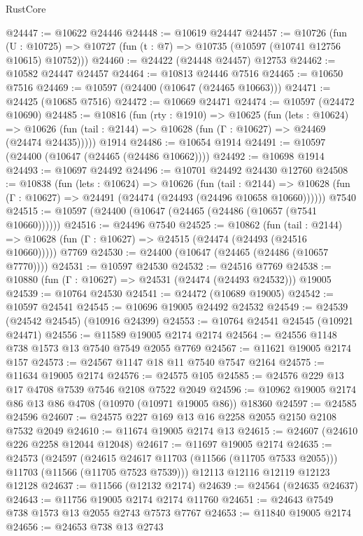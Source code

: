 \begin{lexlean}{RustCore}
\begin{coremodule}
@24447 := @10622 @24446
@24448 := @10619 @24447
@24457 := @10726
    (fun (U : @10725) => @10727 (fun (t : @7) => @10735 (@10597 (@10741 @12756 @10615) @10752)))
@24460 := @24422 (@24448 @24457) @12753
@24462 := @10582 @24447 @24457
@24464 := @10813 @24446 @7516
@24465 := @10650 @7516
@24469 := @10597 (@24400 (@10647 (@24465 @10663)))
@24471 := @24425 (@10685 @7516)
@24472 := @10669 @24471
@24474 := @10597 (@24472 @10690)
@24485 := @10816
    (fun (rty : @1910) =>
    @10625
      (fun (lets : @10624) =>
      @10626 (fun (tail : @2144) => @10628 (fun (Γ : @10627) => @24469 (@24474 @24435)))))
    @1914
@24486 := @10654 @1914
@24491 := @10597 (@24400 (@10647 (@24465 (@24486 @10662))))
@24492 := @10698 @1914
@24493 := @10697 @24492
@24496 := @10701 @24492 @24430 @12760
@24508 := @10838
    (fun (lets : @10624) =>
    @10626
      (fun (tail : @2144) =>
      @10628 (fun (Γ : @10627) => @24491 (@24474 (@24493 (@24496 @10658 @10660))))))
    @7540
@24515 := @10597 (@24400 (@10647 (@24465 (@24486 (@10657 (@7541 @10660))))))
@24516 := @24496 @7540
@24525 := @10862
    (fun (tail : @2144) => @10628 (fun (Γ : @10627) => @24515 (@24474 (@24493 (@24516 @10660)))))
    @7769
@24530 := @24400 (@10647 (@24465 (@24486 (@10657 @7770))))
@24531 := @10597 @24530
@24532 := @24516 @7769
@24538 := @10880 (fun (Γ : @10627) => @24531 (@24474 (@24493 @24532))) @19005
@24539 := @10764 @24530
@24541 := @24472 (@10689 @19005)
@24542 := @10597 @24541
@24545 := @10696 @19005 @24492 @24532
@24549 := @24539 (@24542 @24545) (@10916 @24399)
@24553 := @10764 @24541 @24545 (@10921 @24471)
@24556 := @11589 @19005 @2174 @2174
@24564 := @24556 @1148 @738 @1573 @13 @7540 @7549 @2055 @7769
@24567 := @11621 @19005 @2174 @157
@24573 := @24567 @1147 @18 @11 @7540 @7547 @2164
@24575 := @11634 @19005 @2174
@24576 := @24575 @105
@24585 := @24576 @229 @13 @17 @4708 @7539 @7546 @2108 @7522 @2049
@24596 := @10962 @19005 @2174 @86 @13 @86 @4708 (@10970 (@10971 @19005 @86)) @18360
@24597 := @24585 @24596
@24607 := @24575 @227 @169 @13 @16 @2258 @2055 @2150 @2108 @7532 @2049
@24610 := @11674 @19005 @2174 @13
@24615 := @24607 (@24610 @226 @2258 @12044 @12048)
@24617 := @11697 @19005 @2174
@24635 := @24573
    (@24597
      (@24615 @24617 @11703 (@11566 (@11705 @7533 @2055)))
      @11703
      (@11566 (@11705 @7523 @7539)))
    @12113
    @12116
    @12119
    @12123
    @12128
@24637 := @11566 (@12132 @2174)
@24639 := @24564 (@24635 @24637)
@24643 := @11756 @19005 @2174 @2174 @11760
@24651 := @24643 @7549 @738 @1573 @13 @2055 @2743 @7573 @7767
@24653 := @11840 @19005 @2174
@24656 := @24653 @738 @13 @2743

\end{coremodule}
\end{lexlean}
